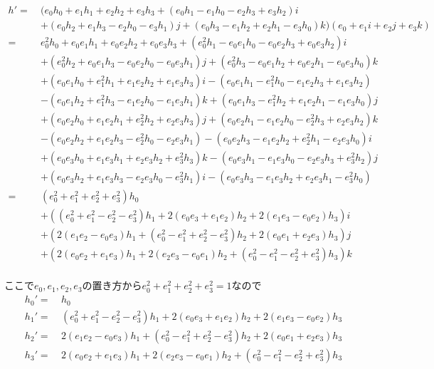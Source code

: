 \documentclass[a4paper,12pt,notitlepage]{jsreport}
\begin{document}
\begin{equation}
  \begin{split}
    h'=~&(e_0h_0+e_1h_1+e_2h_2+e_3h_3+(e_0h_1-e_1h_0-e_2h_3+e_3h_2)i\\
    &+(e_0h_2+e_1h_3-e_2h_0-e_3h_1)j+(e_0h_3-e_1h_2+e_2h_1-e_3h_0)k)(e_0+e_1i+e_2j+e_3k)\\
    =~&e_0^2h_0+e_0e_1h_1+e_0e_2h_2+e_0e_3h_3+(e_0^2h_1-e_0e_1h_0-e_0e_2h_3+e_0e_3h_2)i\\
    &+(e_0^2h_2+e_0e_1h_3-e_0e_2h_0-e_0e_3h_1)j+(e_0^2h_3-e_0e_1h_2+e_0e_2h_1-e_0e_3h_0)k\\
    &+(e_0e_1h_0+e_1^2h_1+e_1e_2h_2+e_1e_3h_3)i-(e_0e_1h_1-e_1^2h_0-e_1e_2h_3+e_1e_3h_2)\\
    &-(e_0e_1h_2+e_1^2h_3-e_1e_2h_0-e_1e_3h_1)k+(e_0e_1h_3-e_1^2h_2+e_1e_2h_1-e_1e_3h_0)j\\
    &+(e_0e_2h_0+e_1e_2h_1+e_2^2h_2+e_2e_3h_3)j+(e_0e_2h_1-e_1e_2h_0-e_2^2h_3+e_2e_3h_2)k\\
    &-(e_0e_2h_2+e_1e_2h_3-e_2^2h_0-e_2e_3h_1)-(e_0e_2h_3-e_1e_2h_2+e_2^2h_1-e_2e_3h_0)i\\
    &+(e_0e_3h_0+e_1e_3h_1+e_2e_3h_2+e_3^2h_3)k-(e_0e_3h_1-e_1e_3h_0-e_2e_3h_3+e_3^2h_2)j\\
    &+(e_0e_3h_2+e_1e_3h_3-e_2e_3h_0-e_3^2h_1)i-(e_0e_3h_3-e_1e_3h_2+e_2e_3h_1-e_3^2h_0)\\
    =~&(e_0^2+e_1^2+e_2^2+e_3^2)h_0\\
    &+((e_0^2+e_1^2-e_2^2-e_3^2)h_1+2(e_0e_3+e_1e_2)h_2+2(e_1e_3-e_0e_2)h_3)i\\
    &+(2(e_1e_2-e_0e_3)h_1+(e_0^2-e_1^2+e_2^2-e_3^2)h_2+2(e_0e_1+e_2e_3)h_3)j\\
    &+(2(e_0e_2+e_1e_3)h_1+2(e_2e_3-e_0e_1)h_2+(e_0^2-e_1^2-e_2^2+e_3^2)h_3)k\\
  \end{split}
\end{equation}

ここで$e_0,e_1,e_2,e_3$の置き方から$e_0^2+e_1^2+e_2^2+e_3^2=1$なので
\begin{equation}
  \begin{split}
    h_0'=~&h_0\\
    h_1'=~&(e_0^2+e_1^2-e_2^2-e_3^2)h_1+2(e_0e_3+e_1e_2)h_2+2(e_1e_3-e_0e_2)h_3\\
    h_2'=~&2(e_1e_2-e_0e_3)h_1+(e_0^2-e_1^2+e_2^2-e_3^2)h_2+2(e_0e_1+e_2e_3)h_3\\
    h_3'=~&2(e_0e_2+e_1e_3)h_1+2(e_2e_3-e_0e_1)h_2+(e_0^2-e_1^2-e_2^2+e_3^2)h_3\\
  \end{split}
\end{equation}
\end{document}
